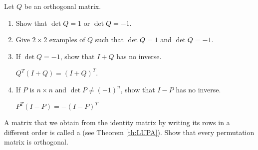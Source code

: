 \documentclass{ximera}
\begin{document}
\begin{problem}\label{prob:ortho19}
Let $Q$ be an orthogonal matrix.

\begin{enumerate}
\item Show that $\det Q = 1$ or $\det Q = -1$.

\item Give $2 \times 2$ examples of $Q$ such that $\det Q = 1$ and $\det  Q = -1$.

\item If $\det  Q = -1$, show that $I + Q$ has no inverse.
\begin{hint}
$Q^{T}(I + Q) = (I + Q)^{T}$.
\end{hint}

\item If $P$ is $n \times n$ and $\det P \neq (-1)^{n}$, show that $I - P$ has no inverse.

\begin{hint}
$P^{T}(I - P) = -(I - P)^{T}$
\end{hint}
\end{enumerate}


\end{problem}


\begin{problem}\label{prob:ortho21}
A matrix that we obtain from the identity matrix by writing its rows in a different order is called a  (see Theorem \ref{th:LUPA}). Show that every permutation matrix is orthogonal.
\end{problem}
\end{document}
